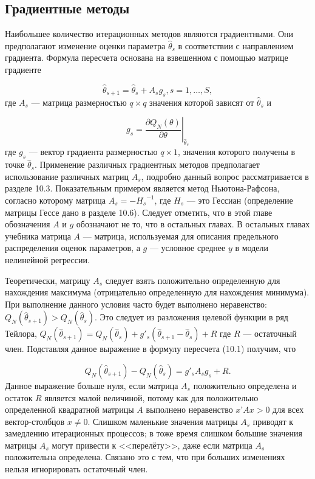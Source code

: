 \subsection{Градиентные методы}

Наибольшее количество итерационных методов являются градиентными. Они предполагают изменение оценки параметра $\hat{\theta}_s$ в соответствии с направлением градиента. Формула пересчета основана на взвешенном с помощью матрице градиенте

\begin{equation}
\hat{\theta}_{s+1}=\hat{\theta}_{s}+A_{s}g_{s}, s=1,\ldots ,S,
\end{equation}
где $A_s$ --- матрица размерностью $q \times q$ значения которой зависят от $\hat{\theta}_s$ и

\begin{equation}
g_s=\left. \dfrac{\partial{Q_N}{(\theta)}}{\partial\theta}\right|_{\hat{\theta}_{s}}
\end{equation}
где $g_s$ --- вектор градиента размерностью $q \times 1$, значения которого получены в точке $\hat{\theta}_s$. Применение различных градиентных методов предполагает использование различных матриц $A_s$, подробно данный вопрос рассматривается в разделе 10.3. Показательным примером является метод Ньютона-Рафсона, согласно которому матрица $A_s=-{H_s}^{-1}$, где $H_s$ --- это Гессиан (определение матрицы Гессе дано в разделе 10.6). Следует отметить, что в  этой главе обозначения $A$ и $g$ обозначают не то, что в остальных главах.  В остальных главах учебника матрица $A$ --- матрица, используемая для описания предельного распределения оценок параметров, а $g$ --- условное среднее  $y$ в модели нелинейной регрессии.

Теоретически,  матрицу $A_s$ следует взять положительно определенную для нахождения максимума (отрицательно определенную для нахождения минимума). При выполнение данного условия часто будет выполнено неравенство: $Q_N(\hat{\theta}_{s+1})>Q_N({\hat{\theta}}_s)$. Это следует из разложения целевой функции в ряд Тейлора, $Q_N(\hat{\theta}_{s+1})=Q_N(\hat{\theta}_s)+g'_s(\hat{\theta}_{s+1}-\hat{\theta}_s)+R$  где $R$ --- остаточный член. Подставляя данное выражение в формулу пересчета (10.1) получим, что

\[
Q_N(\hat{\theta}_{s+1})-Q_N(\hat{\theta}_s)=g'_sA_sg_s+R.
\]
Данное выражение больше нуля, если матрица $A_s$ положительно определена и остаток $R$ является малой величиной, потому как для положительно определенной квадратной матрицы $A$ выполнено неравенство $x’Ax>0$ для всех вектор-столбцов $x\neq0$. Слишком маленькие значения матрицы $A_s$ приводят к замедлению итерационных процессов; в тоже время слишком большие значения матрицы $A_s$ могут привести к <<перелёту>>, даже если матрица $A_s$ положительна определена. Связано это с тем, что при больших изменениях нельзя игнорировать остаточный член.

